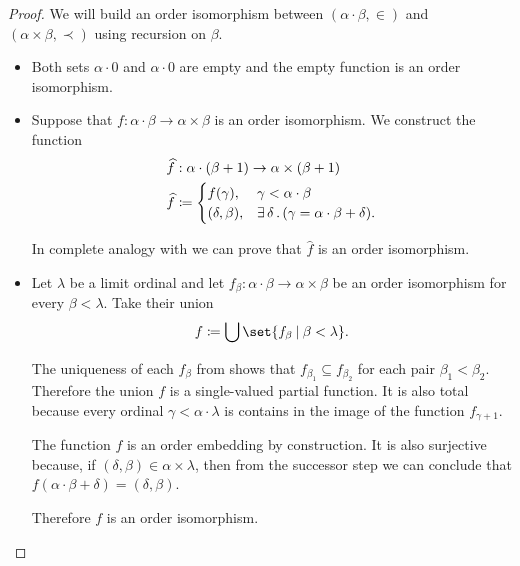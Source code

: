 \begin{proof}
  We will build an order isomorphism between \( (\alpha \cdot \beta, \in) \) and \( (\alpha \times \beta, \prec) \) using recursion on \( \beta \).
  \begin{itemize}
    \item Both sets \( \alpha \cdot 0 \) and \( \alpha \cdot 0 \) are empty and the empty function is an order isomorphism.
    \item Suppose that \( f: \alpha \cdot \beta \to \alpha \times \beta \) is an order isomorphism. We construct the function
    \begin{equation*}
      \begin{aligned}
        &\widehat f: \alpha \cdot (\beta + 1) \to \alpha \times (\beta + 1) \\
        &\widehat f \coloneqq \begin{cases}
          f(\gamma),       &\gamma < \alpha \cdot \beta \\
          (\delta, \beta), &\exists \thinspace \delta \thinspace . \thinspace (\gamma = \alpha \cdot \beta + \delta).
        \end{cases}
      \end{aligned}
    \end{equation*}

    In complete analogy with  we can prove that \( \widehat f \) is an order isomorphism.

    \item Let \( \lambda \) be a limit ordinal and let \( f_\beta: \alpha \cdot \beta \to \alpha \times \beta \) be an order isomorphism for every \( \beta < \lambda \). Take their union
    \begin{equation*}
      f \coloneqq \bigcup\set{ f_\beta \given \beta < \lambda }.
    \end{equation*}

    The uniqueness of each \( f_\beta \) from  shows that \( f_{\beta_1} \subseteq f_{\beta_2} \) for each pair \( \beta_1 < \beta_2 \). Therefore the union \( f \) is a single-valued partial function. It is also total because every ordinal \( \gamma < \alpha \cdot \lambda \) is contains in the image of the function \( f_{\gamma + 1} \).

    The function \( f \) is an order embedding by construction. It is also surjective because, if \( (\delta, \beta) \in \alpha \times \lambda \), then from the successor step we can conclude that \( f(\alpha \cdot \beta + \delta) = (\delta, \beta) \).

    Therefore \( f \) is an order isomorphism.
  \end{itemize}
\end{proof}

